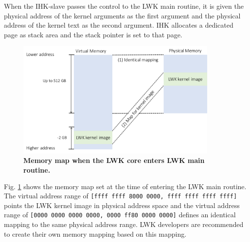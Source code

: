 \documentclass[twoside,11pt,fleqn]{book}
\begin{document}
When the IHK-slave passes the control to the LWK main routine, it is given the physical address of the kernel arguments as the first argument and the physical address of the kernel text as the second argument.
IHK allocates a dedicated page as stack area and the stack pointer is set to that page.
%
\begin{figure}[h]
\centering
\includegraphics[width=10cm]{figs/memory_map.pdf}
\vspace{-0em}\caption{\textbf{Memory map when the LWK core enters LWK main routine.}}
\label{fig:memory_map}
\vspace{-0em}
\end{figure}
%
Fig. \ref{fig:memory_map} shows the memory map set at the time of entering the LWK main routine.
The virtual address range of \texttt{[ffff ffff 8000 0000, ffff ffff ffff ffff]} points the LWK kernel image in physical address space
and the virtual address range of \texttt{[0000 0000 0000 0000, 0000 ff80 0000 0000]} defines an identical mapping to the same physical address range.
LWK developers are recommended to create their own memory mapping based on this mapping.






\end{document}
